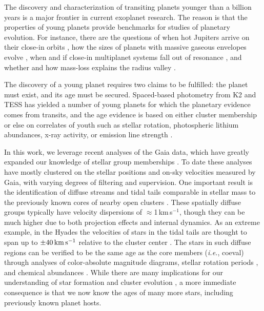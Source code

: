 \documentclass[12pt,twocolumn,linenumbers]{aastex63}
\newcommand{\kms}{\,km\,s$^{-1}$}
\newcommand{\mkms}{{\rm \,km\,s^{-1}}}  %
\begin{document}
The discovery and characterization of transiting planets younger than
a billion years is a major frontier in current exoplanet research.
The reason is that the properties of young planets provide benchmarks
for studies of planetary evolution.  For instance, there are the
questions of when hot Jupiters arrive on their close-in orbits
\citep{dawson_johnson_2018}, how the sizes of planets with massive
gaseous envelopes evolve \citep{rizzuto_tess_2020}, when and if
close-in multiplanet systems fall out of resonance
\citep{arevalo_stability_2022,goldberg_architectures_2022}, and
whether and how mass-loss explains the radius valley
\citep{lopez_how_2012,Owen_Wu_2013,Fulton_et_al_2017,ginzburg_corepowered_2018,lee_primordial_2021}.

The discovery of a young planet requires two claims to be fulfilled:
the planet must exist, and its age must be secured.  Spaced-based
photometry from K2 and TESS has yielded a number of young planets for
which the planetary evidence comes from transits, and the age evidence
is based on either cluster membership \citep{Mann_et_al_2017,david_four_2019,newton_tess_2019,bouma_cluster_2020,nardiello_pathosII_2020}
or else on correlates of youth such as stellar rotation, photospheric
lithium abundances, x-ray activity, or emission line strength
\citep{zhou_2021_tois,hedges_toi-2076_2021}.

In this work, we leverage recent analyses of the Gaia data, which have
greatly expanded our knowledge of stellar group memberships
\citep[{\it e.g.},][]{CantatGaudin2018a,KounkelCovey2019,Kerr2021}.
To date these analyses have mostly clustered on the stellar positions and
on-sky velocities measured by Gaia, with varying degrees of filtering
and supervision.  One important result is the identification of
diffuse streams and tidal tails comparable in stellar mass to the
previously known cores of nearby open clusters
\citep{meingast_psceri_2019,Meingast2021,gagne_number_2021}.  These
spatially diffuse groups typically have velocity dispersions of
$\approx$1\kms, though they can be much higher due to both projection
effects and internal dynamics.  As an extreme example, in the Hyades
the velocities of stars in the tidal tails are thought to
span up to $\pm 40\mkms$ relative to the cluster center
\citep{jerabkova_800_2021}.  The stars in such diffuse regions can be
verified to be the same age as the core members ({\it i.e.}, coeval)
through analyses of color-absolute magnitude diagrams, stellar
rotation periods \citep{curtis_tess_2019,bouma_2021_ngc2516}, and
chemical abundances \citep{hawkins_2020}.  While there are many
implications for our understanding of star formation and cluster
evolution \citep{dinnbier_tidal_2020}, a more immediate
consequence is that we now know the ages of many more stars, including
previously known planet hosts.
\end{document}

